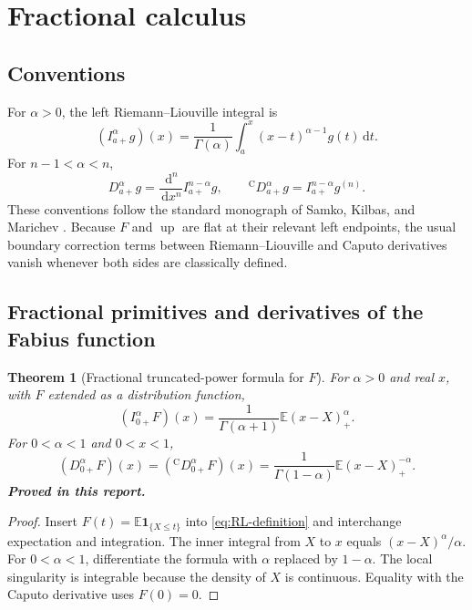\documentclass[11pt,oneside]{article}
\numberwithin{equation}{section}
\newtheorem{theorem}{Theorem}[section]
\theoremstyle{definition}
\theoremstyle{remark}
\newcommand{\Up}{\operatorname{up}}
\newcommand{\dd}{\,\mathrm d}
\newcommand{\E}{\mathbb E}
\newcommand{\statusproved}{\textcolor{proofgreen}{\textbf{Proved in this report.}}}
\begin{document}
\section{Fractional calculus}
\label{sec:fractional}

\subsection{Conventions}

For \(\alpha>0\), the left Riemann--Liouville integral is
\begin{equation}
 (I_{a+}^{\alpha}g)(x)
 =\frac1{\Gamma(\alpha)}\int_a^x(x-t)^{\alpha-1}g(t)\dd t.
 \label{eq:RL-definition}
\end{equation}
For \(n-1<\alpha<n\),
\begin{equation}
 D_{a+}^{\alpha}g=\frac{\dd^n}{\dd x^n}I_{a+}^{n-\alpha}g,
 \qquad
 {}^{\mathrm C}D_{a+}^{\alpha}g=I_{a+}^{n-\alpha}g^{(n)}.
 \label{eq:RL-Caputo}
\end{equation}
These conventions follow the standard monograph of Samko, Kilbas, and Marichev
\cite{samko}.  Because \(F\) and \(\Up\) are flat at their relevant left
endpoints, the usual boundary correction terms between Riemann--Liouville and
Caputo derivatives vanish whenever both sides are classically defined.

\subsection{Fractional primitives and derivatives of the Fabius function}

\begin{theorem}[Fractional truncated-power formula for \(F\)]
\label{thm:F-fractional}
For \(\alpha>0\) and real \(x\), with \(F\) extended as a distribution
function,
\begin{equation}
 \boxed{
 (I_{0+}^{\alpha}F)(x)
 =\frac1{\Gamma(\alpha+1)}\E(x-X)_+^{\alpha}.}
 \label{eq:F-fractional-integral}
\end{equation}
For \(0<\alpha<1\) and \(0<x<1\),
\begin{equation}
 \boxed{
 (D_{0+}^{\alpha}F)(x)
 =({}^{\mathrm C}D_{0+}^{\alpha}F)(x)
 =\frac1{\Gamma(1-\alpha)}\E(x-X)_+^{-\alpha}.}
 \label{eq:F-fractional-derivative}
\end{equation}
\statusproved
\end{theorem}

\begin{proof}
Insert \(F(t)=\E\mathbf1_{\{X\le t\}}\) into \eqref{eq:RL-definition} and
interchange expectation and integration.  The inner integral from \(X\) to
\(x\) equals \((x-X)^\alpha/\alpha\).  For \(0<\alpha<1\), differentiate the
formula with \(\alpha\) replaced by \(1-\alpha\).  The local singularity is
integrable because the density of \(X\) is continuous.  Equality with the
Caputo derivative uses \(F(0)=0\).
\end{proof}
\end{document}
